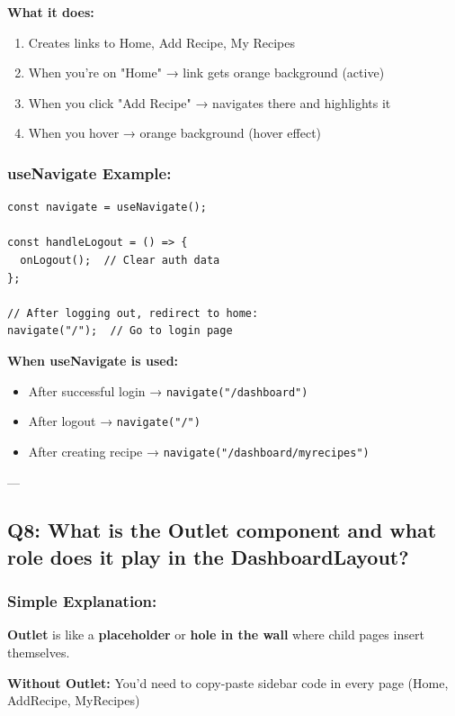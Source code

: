 \documentclass[12pt]{article}
\begin{document}
\textbf{What it does:}

\begin{enumerate}
    \item Creates links to Home, Add Recipe, My Recipes
    \item When you're on "Home" → link gets orange background (active)
    \item When you click "Add Recipe" → navigates there and highlights it
    \item When you hover → orange background (hover effect)
\end{enumerate}

\subsubsection*{useNavigate Example:}

\begin{lstlisting}
const navigate = useNavigate();

const handleLogout = () => {
  onLogout();  // Clear auth data
};

// After logging out, redirect to home:
navigate("/");  // Go to login page
\end{lstlisting}

\textbf{When useNavigate is used:}

\begin{itemize}
    \item After successful login → \texttt{navigate("/dashboard")}
    \item After logout → \texttt{navigate("/")}
    \item After creating recipe → \texttt{navigate("/dashboard/myrecipes")}
\end{itemize}

---

\subsection{Q8: What is the Outlet component and what role does it play in the DashboardLayout?}

\subsubsection*{Simple Explanation:}

\textbf{Outlet} is like a \textbf{placeholder} or \textbf{hole in the wall} where child pages insert themselves.

\textbf{Without Outlet:} You'd need to copy-paste sidebar code in every page (Home, AddRecipe, MyRecipes)
\end{document}
